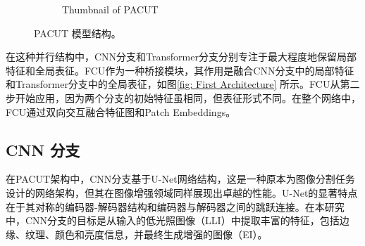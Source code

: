 \documentclass[a4paper]{ctexart}
\newcommand{\upcite}[1]{\rmfamily\textsuperscript{\textsuperscript{\cite{#1}}}}
\begin{document}
\begin{figure}[htb]
\begin{subfigure}{0.4\textwidth}
		\captionsetup{font=scriptsize}
		\caption{Thumbnail of PACUT}
		\label{fig: The proposed initial architecture(Abstract Picture)}	
	\end{subfigure}
	\caption{
		\label{fig: PACUT}
		PACUT 模型结构。
	}
\end{figure}


在这种并行结构中，CNN分支和Transformer分支分别专注于最大程度地保留局部特征和全局表征。FCU作为一种桥接模块，其作用是融合CNN分支中的局部特征和Transformer分支中的全局表征，如图\ref{fig: First Architecture} 所示。FCU从第二步开始应用，因为两个分支的初始特征虽相同，但表征形式不同。在整个网络中，FCU通过双向交互融合特征图和Patch Embeddings。


\subsection{CNN 分支}

在PACUT架构中，CNN分支基于U-Net网络结构，这是一种原本为图像分割任务设计的网络架构，但其在图像增强领域同样展现出卓越的性能。U-Net的显著特点在于其对称的编码器-解码器结构和编码器与解码器之间的跳跃连接。在本研究中，CNN分支的目标是从输入的低光照图像（LLI）中提取丰富的特征，包括边缘、纹理、颜色和亮度信息，并最终生成增强的图像（EI）。
\end{document}
